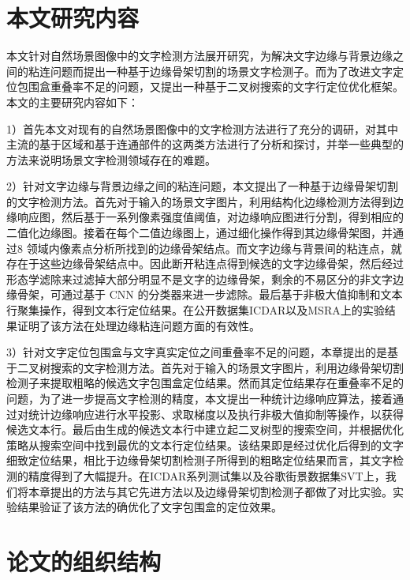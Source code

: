     \section{本文研究内容}
    
    本文针对自然场景图像中的文字检测方法展开研究，为解决文字边缘与背景边缘之间的粘连问题而提出一种基于边缘骨架切割的场景文字检测子。而为了改进文字定位包围盒重叠率不足的问题，又提出一种基于二叉树搜索的文字行定位优化框架。本文的主要研究内容如下：
    
    1）首先本文对现有的自然场景图像中的文字检测方法进行了充分的调研，对其中主流的基于区域和基于连通部件的这两类方法进行了分析和探讨，并举一些典型的方法来说明场景文字检测领域存在的难题。
    
    2）针对文字边缘与背景边缘之间的粘连问题，本文提出了一种基于边缘骨架切割的文字检测方法。首先对于输入的场景文字图片，利用结构化边缘检测方法得到边缘响应图，然后基于一系列像素强度值阈值，对边缘响应图进行分割，得到相应的二值化边缘图。接着在每个二值边缘图上，通过细化操作得到其边缘骨架图，并通过8 领域内像素点分析所找到的边缘骨架结点。而文字边缘与背景间的粘连点，就存在于这些边缘骨架结点中。因此断开粘连点得到候选的文字边缘骨架，然后经过形态学滤除来过滤掉大部分明显不是文字的边缘骨架，剩余的不易区分的非文字边缘骨架，可通过基于 CNN 的分类器来进一步滤除。最后基于非极大值抑制和文本行聚集操作，得到文本行定位结果。在公开数据集ICDAR以及MSRA上的实验结果证明了该方法在处理边缘粘连问题方面的有效性。
    
    3）针对文字定位包围盒与文字真实定位之间重叠率不足的问题，本章提出的是基于二叉树搜索的文字检测方法。首先对于输入的场景文字图片，利用边缘骨架切割检测子来提取粗略的候选文字包围盒定位结果。然而其定位结果存在重叠率不足的问题，为了进一步提高文字检测的精度，本文提出一种统计边缘响应算法，接着通过对统计边缘响应进行水平投影、求取梯度以及执行非极大值抑制等操作，以获得候选文本行。最后由生成的候选文本行中建立起二叉树型的搜索空间，并根据优化策略从搜索空间中找到最优的文本行定位结果。该结果即是经过优化后得到的文字细致定位结果，相比于边缘骨架切割检测子所得到的粗略定位结果而言，其文字检测的精度得到了大幅提升。在ICDAR系列测试集以及谷歌街景数据集SVT上，我们将本章提出的方法与其它先进方法以及边缘骨架切割检测子都做了对比实验。实验结果验证了该方法的确优化了文字包围盒的定位效果。

    \section{论文的组织结构}



